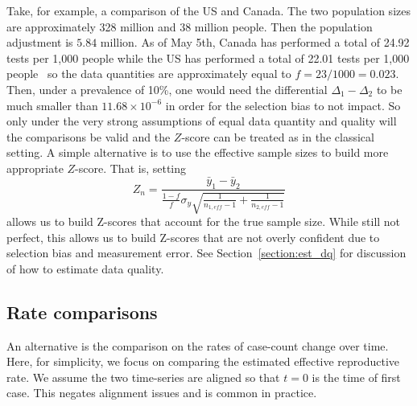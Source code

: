 \documentclass[12pt]{article}
\begin{document}
Take, for example, a comparison of the US and Canada.  The two population sizes are approximately 328 million and 38 million people.  Then the population adjustment is $5.84$ million. As of May 5th, Canada has performed a total of 24.92 tests per 1,000 people while the US has performed a total of 22.01 tests per 1,000 people~\cite{worlddata} so the data quantities are approximately equal to $f = 23/1000 = 0.023$.  Then, under a prevalence of 10\%, one would need the differential $\Delta_1-\Delta_2$ to be much smaller than $11.68 \times 10^{-6}$ in order for the selection bias to not impact.  So only under the very strong assumptions of equal data quantity and quality will the comparisons be valid and the $Z$-score can be treated as in the classical setting.  A simple alternative is to use the effective sample sizes to build more appropriate $Z$-score.  That is, setting
$$
Z_n = \frac{\bar y_1 - \bar y_2}{ \frac{1-f}{f} \sigma_y \sqrt{ \frac{1}{n_{1,eff} - 1} + \frac{1}{n_{2,eff} - 1}}}
$$
allows us to build Z-scores that account for the true sample size.  While still not perfect, this allows us to build Z-scores that are not overly confident due to selection bias and measurement error.  See Section~\ref{section:est_dq} for discussion of how to estimate data quality.

\subsection*{Rate comparisons}

An alternative is the comparison on the rates of case-count change over time.  Here, for simplicity, we focus on comparing the estimated effective reproductive rate.  We assume the two time-series are aligned so that $t=0$ is the time of first case.  This negates alignment issues and is common in practice.
\end{document}
